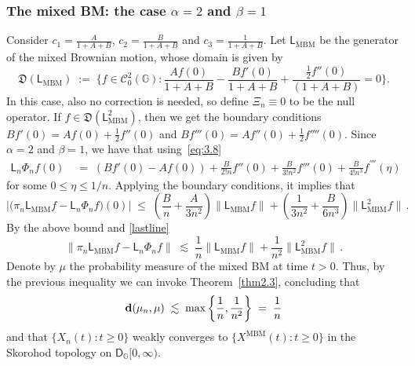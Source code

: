 \documentclass[12pt,a4paper]{article}
\theoremstyle{plain}
\theoremstyle{remark}
\newcommand{\msf}[1]{{\mathsf #1}}
\newcommand{\mc}[1]{{\mathcal #1}}
\newcommand{\mf}[1]{{\mathfrak #1}}
\newcommand{\bb}[1]{{\mathbb #1}}
\newcommand{\norm}[1]{\lVert#1\rVert}
\begin{document}
	\subsubsection{The mixed BM: the case \texorpdfstring{$\alpha = 2$}{alpha =2} and \texorpdfstring{$\beta = 1$}{beta =1}}
	Consider
	$c_1 = \frac{A}{1 + A + B}$, $c_2 = \frac{B}{1 + A +B}$ and $c_3 = \frac{1}{1 + A + B}$.
	Let  $\msf{L}_\text{MBM}$ be the generator of the mixed Brownian motion, whose domain is given by
	\begin{equation*}
		\mf{D}\left(\msf{L}_\text{MBM}\right) \;:=\; \Big\{f \in \mc{C}_0^2(\bb{G}):\frac{Af(0)}{1 + A + B} - \frac{Bf'(0)}{1 + A +B} + \frac{\frac{1}{2}f''(0)}{(1 + A + B)} = 0\Big\}.
	\end{equation*}
	In this case, also no correction is needed, so define $\Xi_n\equiv 0$ to be the null operator.
	If $f \in \mf{D}(\msf{L}_{\text{MBM}}^2)$, then we get the boundary conditions $Bf'(0) = Af(0) + \frac{1}{2}f''(0)$ and $Bf'''(0) = Af''(0) + \frac{1}{2}f''''(0)$. Since $\alpha=2$ and $\beta=1$, we have that using~\eqref{eq:3.8}
	\begin{align*}
		\msf{L}_n\Phi_nf(0) &\;=\; \left(Bf'(0) - Af(0)\right) + \frac{B}{2!n}f''(0) + \frac{B}{3!n^2}f'''(0) + \frac{B}{4!n^3}f^{''''}(\eta)
	\end{align*}
	for some $0\leq \eta\leq 1/n$. Applying the boundary conditions, it implies that
	\begin{equation*}
		\Big|\big(\pi_n\msf{L}_\text{MBM}f - \msf{L}_n\Phi_nf\big)(0)\Big| \;\leq\; \left(\frac{B}{n} + \frac{A}{3n^2}\right)\norm{\msf{L}_\text{MBM}f} + \left(\frac{1}{3n^2} + \frac{B}{6n^3}\right)\|\msf{L}_\text{MBM}^2f\|\,.
	\end{equation*}
	By the above bound and \eqref{lastline}
	\begin{equation*}
		\norm{\pi_n\msf{L}_\text{MBM}f-\msf{L}_n\Phi_nf}\; \lesssim\; \frac{1}{n}\norm{\msf{L}_\text{MBM}f} + \frac{1}{n^2}\|\msf{L}_\text{MBM}^2f\|\,.
	\end{equation*}
	Denote by $\mu$ the probability measure of the mixed BM at time $t>0$.
	Thus, by  the previous inequality we can invoke Theorem~\ref{thm2.3}, concluding that
	\begin{equation*}
		{\bf d}(\mu_n, \mu) \;\lesssim\;  \max\left\{\frac{1}{n}, \frac{1}{n^2}\right\}\;=\; \frac{1}{n}
	\end{equation*}
	and that $\{X_{n}(t): t \geq 0\}$ weakly converges to $\{X^{\text{MBM}}(t): t\geq 0\}$ in the Skorohod topology on $\msf{D}_\bb{G}[0,\infty)$.
	
\end{document}
